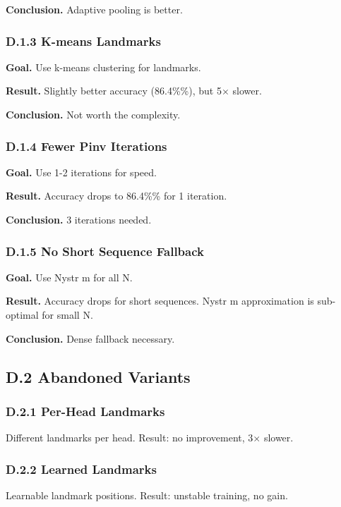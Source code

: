 \textbf{Conclusion.} Adaptive pooling is better.

\subsubsection{D.1.3 K-means Landmarks}

\textbf{Goal.} Use k-means clustering for landmarks.

\textbf{Result.} Slightly better accuracy (86.4\%\%), but 5$\times$ slower.

\textbf{Conclusion.} Not worth the complexity.

\subsubsection{D.1.4 Fewer Pinv Iterations}

\textbf{Goal.} Use 1-2 iterations for speed.

\textbf{Result.} Accuracy drops to 86.4\%\% for 1 iteration.

\textbf{Conclusion.} 3 iterations needed.

\subsubsection{D.1.5 No Short Sequence Fallback}

\textbf{Goal.} Use Nystr m for all N.

\textbf{Result.} Accuracy drops for short sequences. Nystr m approximation is 
sub-optimal for small N.

\textbf{Conclusion.} Dense fallback necessary.

\subsection{D.2 Abandoned Variants}

\subsubsection{D.2.1 Per-Head Landmarks}

Different landmarks per head. Result: no improvement, 3$\times$ slower.

\subsubsection{D.2.2 Learned Landmarks}

Learnable landmark positions. Result: unstable training, no gain.

